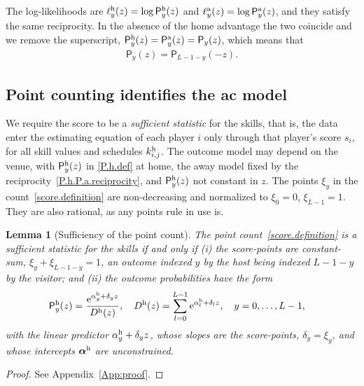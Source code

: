 \documentclass[letterpaper,12pt]{article}
\newcommand{\mr}[1]{\mathrm{#1}}
\newcommand{\tnr}[1]{{\textnormal{#1}}}
\newcommand{\mf}[1]{\mathsf{#1}}
\newcommand{\balpha}{\boldsymbol{\alpha}}
\newcommand{\ld}{\ldots}
\newcommand{\e}{\mr{e}}
\newcommand{\mfP}{\mf{P}}
\newtheorem{lemma}{Lemma}
\begin{document}
The log-likelihoods are $\ell^\tnr{h}_y(z)=\log\mfP^\tnr{h}_y(z)$ and $\ell^\tnr{a}_y(z)=\log\mfP^\tnr{a}_y(z)$, and they satisfy the same reciprocity. In the absence of the home advantage the two coincide and we remove the superscript, $\mfP^\tnr{h}_y(z)=\mfP^\tnr{a}_y(z)=\mfP_y(z)$, which means that
\begin{align}
\label{P.y.symmetry}
    \mfP_y(z)=\mfP_{L-1-y}(-z).
\end{align}

\subsection{Point counting identifies the \gls{ac} model}\label{Sec:AC.model}

We require the score to be a \emph{sufficient statistic} for the skills, that is, the data enter the estimating equation of each player $i$ only through that player's score $s_i$, for all skill values and schedules $k^\tnr{h}_{i,j}$. The outcome model may depend on the venue, with $\mfP^\tnr{h}_y(z)$ in \eqref{P.h.def} at home, the away model fixed by the reciprocity~\eqref{P.h.P.a.reciprocity}, and $\mfP^\tnr{h}_y(z)$ not constant in $z$. The points $\xi_y$ in the count~\eqref{score.definition} are non-decreasing and normalized to $\xi_0=0$, $\xi_{L-1}=1$. They are also rational, as any points rule in use is.

\begin{lemma}[Sufficiency of the point count]\label{Lem:score.characterization}
The point count~\eqref{score.definition} is a sufficient statistic for the skills if and only if
(i) the score-points are constant-sum, $\xi_y+\xi_{L-1-y}=1$, an outcome indexed $y$ by the host being indexed $L-1-y$ by the visitor; and
(ii) the outcome probabilities have the form
\begin{align}
\label{AC.model}
    \mfP^\tnr{h}_{y}(z)&= \frac{\e^{\alpha^\tnr{h}_y + \delta_y z}}{D^\tnr{h}(z)},
    \quad D^\tnr{h}(z)=\sum_{l=0}^{L-1} \e^{\alpha^\tnr{h}_l + \delta_l z},
    \quad y=0,\ld, L-1,
\end{align}
with the linear predictor $\alpha^\tnr{h}_y+\delta_y z$, whose slopes are the score-points, $\delta_y=\xi_y$, and whose intercepts $\balpha^\tnr{h}$ are unconstrained.
\end{lemma}

\begin{proof}%
See Appendix~\ref{App:proof}.
\end{proof}
\end{document}
